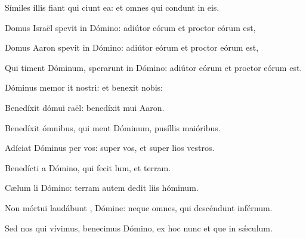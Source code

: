 \item Símiles illis fiant qui ciunt ea:\psstar{} et omnes qui condunt in eis.

\item Domus Israël spevit in Dómino:\psstar{} adiútor eórum et proctor eórum est,

\item Domus Aaron spevit in Dómino:\psstar{} adiútor eórum et proctor eórum est,

\item Qui timent Dóminum, sperarunt in Dómino:\psstar{} adiútor eórum et proctor eórum est.

\item Dóminus memor it nostri:\psstar{} et benexit nobis:

\item Benedíxit dómui raël:\psstar{} benedíxit mui Aaron.

\item Benedíxit ómnibus, qui ment Dóminum,\psstar{} pusíllis  maióribus.

\item Adíciat Dóminus per vos:\psstar{} super vos, et super lios vestros.

\item Benedícti  a Dómino,\psstar{} qui fecit lum, et terram.

\item Cælum li Dómino:\psstar{} terram autem dedit liis hóminum.

\item Non mórtui laudábunt , Dómine:\psstar{} neque omnes, qui descéndunt  inférnum.

\item Sed nos qui vívimus, benecimus Dómino,\psstar{} ex hoc nunc et que in sǽculum.

